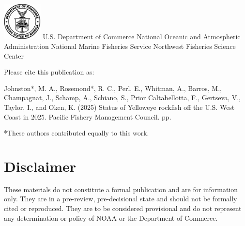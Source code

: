 \documentclass[
]{scrartcl}
\renewcommand*\contentsname{Table of contents}
\newcommand\contentsname{Table of contents}
\begin{document}
\begin{titlepage}
\begin{minipage}[b][\textheight][s]{\textwidth}
  \includegraphics[alt={},width=2cm]{support_files/us_doc_logo.png}\newline %
  U.S. Department of Commerce\newline
  National Oceanic and Atmospheric Administration\newline
  National Marine Fisheries Service\newline
  Northwest Fisheries Science Center\newline

  \end{minipage}
  \restoregeometry
  \end{titlepage}

\renewcommand*\contentsname{Table of contents}
{
\hypersetup{linkcolor=}
\setcounter{tocdepth}{3}
\tableofcontents
}

\setcounter{page}{1}

\renewcommand{\thetable}{\roman{table}}
\renewcommand{\thefigure}{\roman{figure}}

\newpage{}

Please cite this publication as:

Johnston*, M. A., Rosemond*, R. C., Perl, E., Whitman, A., Barros, M.,
Champagnat, J., Schamp, A., Schiano, S., Prior Caltabellotta, F.,
Gertseva, V., Taylor, I., and Oken, K. (2025) Status of Yelloweye
rockfish off the U.S. West Coast in 2025. Pacific Fishery Management
Council. \pageref*{LastPage}{} pp.

*These authors contributed equally to this work.

\newpage{}

\setcounter{page}{1}

\renewcommand{\thetable}{\roman{table}}
\renewcommand{\thefigure}{\roman{figure}}

\section*{Disclaimer}\label{disclaimer}

These materials do not constitute a formal publication and are for
information only. They are in a pre-review, pre-decisional state and
should not be formally cited or reproduced. They are to be considered
provisional and do not represent any determination or policy of NOAA or
the Department of Commerce.
\end{document}
